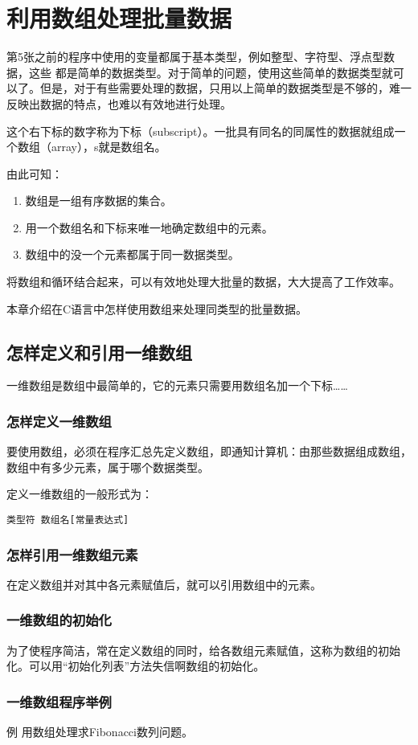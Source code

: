 \chapter{利用数组处理批量数据}
第5张之前的程序中使用的变量都属于基本类型，例如整型、字符型、浮点型数据，这些 都是简单的数据类型。对于简单的问题，使用这些简单的数据类型就可以了。但是，对于有些需要处理的数据，只用以上简单的数据类型是不够的，难一反映出数据的特点，也难以有效地进行处理。

这个右下标的数字称为下标（subscript）。一批具有同名的同属性的数据就组成一个数组（array），s就是数组名。

由此可知：
\begin{enumerate}
	\item 数组是一组有序数据的集合。
	\item 用一个数组名和下标来唯一地确定数组中的元素。
	\item 数组中的没一个元素都属于同一数据类型。
\end{enumerate}

将数组和循环结合起来，可以有效地处理大批量的数据，大大提高了工作效率。

本章介绍在C语言中怎样使用数组来处理同类型的批量数据。
\section{怎样定义和引用一维数组}
一维数组是数组中最简单的，它的元素只需要用数组名加一个下标……
\subsection{怎样定义一维数组}
要使用数组，必须在程序汇总先定义数组，即通知计算机：由那些数据组成数组，数组中有多少元素，属于哪个数据类型。

定义一维数组的一般形式为：
\begin{lstlisting}
类型符 数组名[常量表达式]
\end{lstlisting}
\subsection{怎样引用一维数组元素}
在定义数组并对其中各元素赋值后，就可以引用数组中的元素。
\subsection{一维数组的初始化}
为了使程序简洁，常在定义数组的同时，给各数组元素赋值，这称为数组的初始化。可以用“初始化列表”方法失信啊数组的初始化。
\subsection{一维数组程序举例}
例 用数组处理求Fibonacci数列问题。
